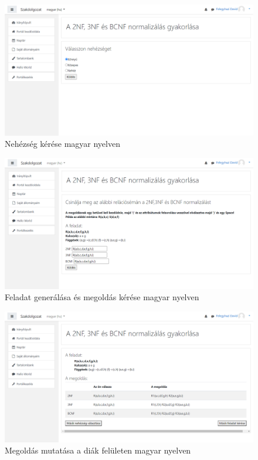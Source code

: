 \begin{figure}
    \centering
    \includegraphics[scale=0.4]{Fejezetek/Images/magyar01.png}
    \caption{Nehézség kérése magyar nyelven}
\end{figure}
\begin{figure}
    \centering
    \includegraphics[scale=0.4]{Fejezetek/Images/magyar02.png}
    \caption{Feladat generálása és megoldás kérése magyar nyelven}
\end{figure}
\begin{figure}
    \centering
    \includegraphics[scale=0.4]{Fejezetek/Images/magyar03.png}
    \caption{Megoldás mutatása a diák felületen magyar nyelven}
\end{figure}
